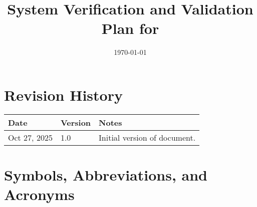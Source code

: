 \documentclass[12pt, titlepage]{article}
\begin{document}
\title{System Verification and Validation Plan for \progname{}}
\author{\authname}
\date{\today}

\maketitle


\section*{Revision History}

\begin{tabularx}{\textwidth}{p{3cm}p{2cm}X}
  \toprule {\bf Date} & {\bf Version} & {\bf Notes}\\
  \midrule
  Oct 27, 2025 & 1.0 & Initial version of document.\\ 
  \bottomrule
\end{tabularx}
\newpage
\tableofcontents
\listoftables

\section{Symbols, Abbreviations, and Acronyms}
\end{document}
